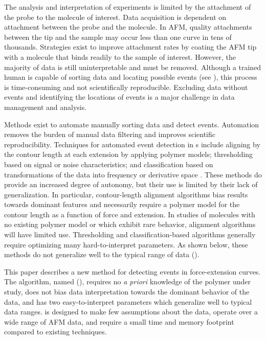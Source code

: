 The analysis and interpretation of \singlemol{} experiments is limited by the attachment of the probe to the molecule of interest. Data acquisition is dependent on attachment between the probe and the molecule. In AFM, quality attachments between the tip and the sample may occur less than one curve in tens of thousands. Strategies exist to improve attachment rates by coating the AFM tip with a molecule that binds readily to the sample of interest.\cite{walder_robert_rapid_nodate} However, the majority of data is still uninterpretable and must be removed. Although a trained human is capable of sorting \singlemol{} data and locating possible events (see ), this process is time-consuming and not scientifically reproducible. Excluding data without events and identifying the locations of events is a major challenge in \singlemol{} data management and analysis.

Methods exist to automate manually sorting \singlemol{} data and detect events. Automation removes the burden of manual data filtering and improves scientific reproducibility. Techniques for automated event detection in \fec{}s include aligning by the contour length at each extension by applying polymer models; thresholding based on signal or noise characteristics; and classification based on transformations of the data into frequency or derivative space . These methods do provide an increased degree of autonomy, but their use is limited by their lack of generalization. In particular, contour-length alignment algorithms bias results towards dominant features and necessarily require a polymer model for the contour length as a function of force and extension. In \singlemol{} studies of molecules with no existing polymer model or which exhibit rare behavior, alignment algorithms will have limited use.  Thresholding and classification-based algorithms generally require optimizing many hard-to-interpret parameters. As shown below, these methods do not generalize well to the typical range of \singlemol{} data ().

This paper describes a new method for detecting events in \singlemol{} force-extension curves.  The algorithm, named \name{} (\acronym{}), requires no \textit{a priori} knowledge of the polymer under study, does not bias data interpretation towards the dominant behavior of the data, and has two easy-to-interpret parameters which generalize well to typical \singlemol{} data ranges. \name{} is designed to make few assumptions about the data, operate over a wide range of AFM data, and require a small time and memory footprint compared to existing techniques.

